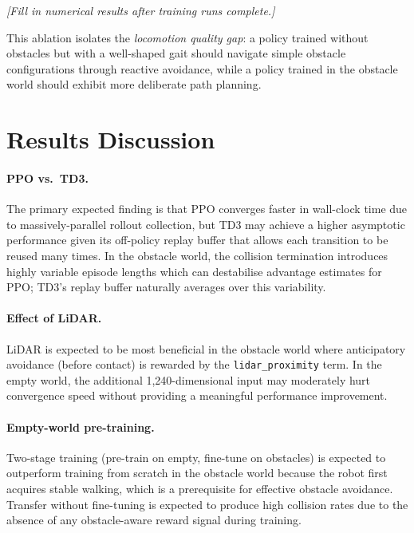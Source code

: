 \documentclass{article}
\begin{document}
\textit{[Fill in numerical results after training runs complete.]}

This ablation isolates the \emph{locomotion quality gap}: a policy trained
without obstacles but with a well-shaped gait should navigate simple obstacle
configurations through reactive avoidance, while a policy trained in the
obstacle world should exhibit more deliberate path planning.

\section{Results Discussion}

\paragraph{PPO vs.\ TD3.}
The primary expected finding is that PPO converges faster in wall-clock time
due to massively-parallel rollout collection, but TD3 may achieve a higher
asymptotic performance given its off-policy replay buffer that allows each
transition to be reused many times.
In the obstacle world, the collision termination introduces highly variable
episode lengths which can destabilise advantage estimates for PPO; TD3's
replay buffer naturally averages over this variability.

\paragraph{Effect of LiDAR.}
LiDAR is expected to be most beneficial in the obstacle world where
anticipatory avoidance (before contact) is rewarded by the
\texttt{lidar\_proximity} term.
In the empty world, the additional 1{,}240-dimensional input may moderately
hurt convergence speed without providing a meaningful performance improvement.

\paragraph{Empty-world pre-training.}
Two-stage training (pre-train on empty, fine-tune on obstacles) is expected
to outperform training from scratch in the obstacle world because the robot
first acquires stable walking, which is a prerequisite for effective obstacle
avoidance.
Transfer without fine-tuning is expected to produce high collision rates due
to the absence of any obstacle-aware reward signal during training.
\end{document}
